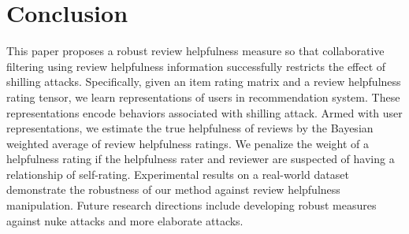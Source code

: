 \documentclass[master,english,final]{kaist-ucs}
\begin{document}
\chapter{Conclusion}
This paper proposes a robust review helpfulness measure so that collaborative filtering using review helpfulness information successfully restricts the effect of shilling attacks. %
Specifically, given an item rating matrix and a review helpfulness rating tensor, we learn representations of users in recommendation system.
These representations encode behaviors associated with shilling attack.
Armed with user representations, we estimate the true helpfulness of reviews by the Bayesian weighted average of review helpfulness ratings.
We penalize the weight of a helpfulness rating if the helpfulness rater and reviewer are suspected of having a relationship of self-rating.
Experimental results on a real-world dataset demonstrate the robustness of our method against review helpfulness manipulation.
Future research directions include developing robust measures against nuke attacks and more elaborate attacks.
\end{document}
